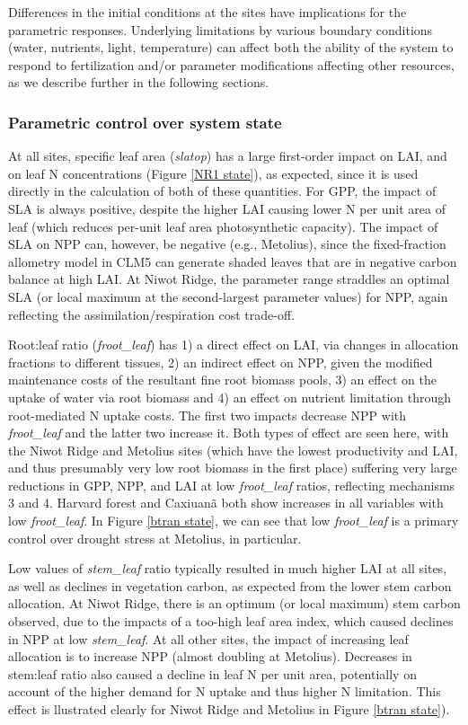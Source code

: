 \documentclass[draft,linenumbers]{agujournal}
\begin{document}
Differences in the initial conditions at the sites have implications for the parametric responses. Underlying limitations by various boundary conditions (water, nutrients, light, temperature) can affect both the ability of the system to respond to fertilization and/or parameter modifications affecting other resources, as we describe further in the following sections. 

\subsubsection{Parametric control over system state}
At all sites, specific leaf area (\emph{slatop}) has a large first-order impact on LAI, and on leaf N concentrations (Figure \ref{NR1 state}), as expected, since it is used directly in the calculation of both of these quantities. For GPP, the impact of SLA is always positive, despite the higher LAI causing lower N per unit area of leaf (which reduces per-unit leaf area photosynthetic capacity). The impact of SLA on NPP can, however, be negative (e.g., Metolius), since the fixed-fraction allometry model in CLM5 can generate shaded leaves that are in negative carbon balance at high LAI. At Niwot Ridge, the parameter range straddles an optimal SLA (or local maximum at the second-largest parameter values) for NPP, again reflecting the assimilation/respiration cost trade-off.

Root:leaf ratio (\emph{froot\_leaf}) has 1) a direct effect on LAI, via changes in allocation fractions to different tissues, 2) an indirect effect on NPP, given the modified maintenance costs of the resultant fine root biomass pools, 3) an effect on the uptake of water via root biomass and 4) an effect on nutrient limitation through root-mediated N uptake costs.  The first two impacts decrease NPP with \emph{froot\_leaf} and the latter two increase it.  Both types of effect are seen here, with the Niwot Ridge and Metolius sites (which have the lowest productivity and LAI, and thus presumably very low root biomass in the first place) suffering very large reductions in GPP, NPP, and LAI at low \emph{froot\_leaf} ratios, reflecting mechanisms 3 and 4.  Harvard forest and Caxiuan\~a both show increases in all variables with low \emph{froot\_leaf}.  In Figure \ref{btran state}, we can see that low \emph{froot\_leaf} is a primary control over drought stress at Metolius, in particular. 

Low values of \emph{stem\_leaf} ratio typically resulted in much higher LAI at all sites, as well as declines in vegetation carbon, as expected from the lower stem carbon allocation. At Niwot Ridge, there is an optimum (or local maximum) stem carbon observed, due to the impacts of a too-high leaf area index, which caused declines in NPP at low \emph{stem\_leaf}. At all other sites, the impact of increasing leaf allocation is to increase NPP (almost doubling at Metolius). Decreases in stem:leaf ratio also caused a decline in leaf N per unit area, potentially on account of the higher demand for N uptake and thus higher N limitation. This effect is llustrated clearly for Niwot Ridge and Metolius in Figure \ref{btran state}). 
\end{document}
